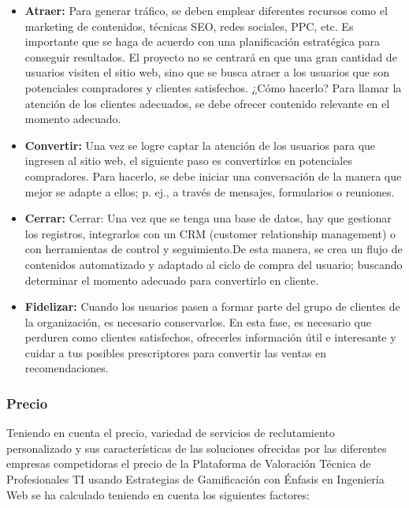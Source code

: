 \begin{itemize}
    \item \textbf{Atraer: }Para generar tráfico, se deben emplear diferentes recursos como el marketing de contenidos, técnicas SEO, redes sociales, PPC, etc. Es importante que se haga de acuerdo con una planificación estratégica para conseguir resultados. El proyecto no se centrará en que una gran cantidad de usuarios visiten el sitio web, sino que se busca atraer a los usuarios que son potenciales compradores y clientes satisfechos. ¿Cómo hacerlo? Para llamar la atención de los clientes adecuados, se debe ofrecer contenido relevante en el momento adecuado.
    
    \item \textbf{Convertir:  }Una vez se logre captar la atención de los usuarios para que ingresen al sitio web, el siguiente paso es convertirlos en potenciales compradores. Para hacerlo, se debe iniciar una conversación de la manera que mejor se adapte a ellos; p. ej., a través de mensajes, formularios o reuniones.
    
    \item \textbf{Cerrar:  }Cerrar: Una vez que se tenga una base de datos, hay que gestionar los registros, integrarlos con un CRM (customer relationship management) o con herramientas de control y seguimiento.De esta manera, se crea un flujo de contenidos automatizado y adaptado al ciclo de compra del usuario; buscando determinar el momento adecuado para convertirlo en cliente.
    
    \item \textbf{Fidelizar:  }Cuando los usuarios pasen a formar parte del grupo de clientes de la organización, es necesario conservarlos. En esta fase, es necesario que perduren como clientes satisfechos, ofrecerles información útil e interesante y cuidar a tus posibles prescriptores para convertir las ventas en recomendaciones.
\end{itemize}


\subsubsection*{Precio}

Teniendo en cuenta el precio, variedad de servicios de reclutamiento personalizado y sus características de las soluciones ofrecidas por las diferentes empresas competidoras el precio de la Plataforma de Valoración Técnica de Profesionales TI usando Estrategias de Gamificación con Énfasis en Ingeniería Web se ha calculado teniendo en cuenta los siguientes factores:

